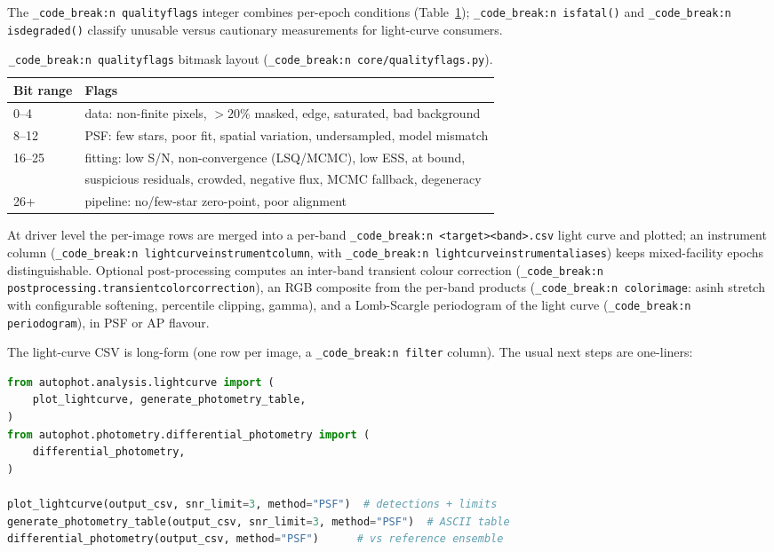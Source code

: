 \documentclass[11pt,a4paper]{article}
\renewcommand{\_}{\autophotunderscore\allowbreak}
\DeclareRobustCommand{\code}[1]{\texttt{\autophot_code_break:n {#1}}}
\begin{document}
The \code{quality\_flags} integer combines per-epoch conditions
(Table~\ref{tab:qflags}); \code{is\_fatal()} and \code{is\_degraded()}
classify unusable versus cautionary measurements for light-curve
consumers.

\begin{table}[ht]
\centering\small
\caption{\code{quality\_flags} bitmask layout (\code{core/quality\_flags.py}).}
\label{tab:qflags}
\begin{tabular}{@{}ll@{}}
\toprule
Bit range & Flags \\
\midrule
0--4 & data: non-finite pixels, $>20\%$ masked, edge, saturated, bad background \\
8--12 & PSF: few stars, poor fit, spatial variation, undersampled, model mismatch \\
16--25 & fitting: low S/N, non-convergence (LSQ/MCMC), low ESS, at bound, \\
       & \hspace{1em} suspicious residuals, crowded, negative flux, MCMC fallback, degeneracy \\
26+ & pipeline: no/few-star zero-point, poor alignment \\
\bottomrule
\end{tabular}
\end{table}

At driver level the per-image rows are merged into a per-band
\code{<target>\_<band>.csv} light curve and plotted; an instrument column
(\code{lightcurve\_instrument\_column}, with
\code{lightcurve\_instrument\_aliases}) keeps mixed-facility epochs
distinguishable. Optional post-processing computes an inter-band
transient colour correction (\code{postprocessing.transient\_color\_correction}),
an RGB composite from the per-band products
(\code{color\_image}: asinh stretch with configurable softening,
percentile clipping, gamma), and a Lomb-Scargle periodogram
\citep{lomb1976,scargle1982} of the light curve
(\code{periodogram\_*}), in PSF or AP flavour.

The light-curve CSV is long-form (one row per image, a \code{filter}
column). The usual next steps are one-liners:

\begin{lstlisting}[language=Python]
from autophot.analysis.lightcurve import (
    plot_lightcurve, generate_photometry_table,
)
from autophot.photometry.differential_photometry import (
    differential_photometry,
)

plot_lightcurve(output_csv, snr_limit=3, method="PSF")  # detections + limits
generate_photometry_table(output_csv, snr_limit=3, method="PSF")  # ASCII table
differential_photometry(output_csv, method="PSF")      # vs reference ensemble
\end{lstlisting}
\end{document}
